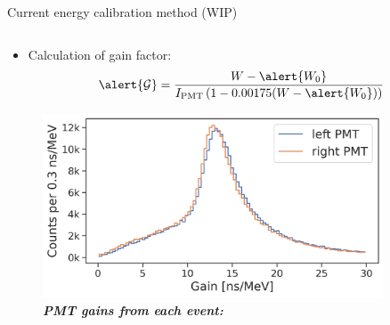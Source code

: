 \documentclass{ikpKoeln}
\begin{document}
\begin{frame}[t]{Current energy calibration method (WIP)}
\begin{columns}[c]
\begin{column}{0.45 \textwidth}
{\begin{itemize}
					      \vspace{-0.5em}
					      $$ \left. \alert{\alpha} = \ln((W_r - W_0) \middle/ (W_l - W_0)) \middle/ (2 \cdot x) \right.$$
					\item \vspace{-1em}Calculation of gain factor:
					      \vspace{-0.5em}
					      $$\alert{\mathcal{G}} = \frac{W - \alert{W_0}}{I_\text{PMT} \left(1 - 0.00175(W - \alert{W_0})\right)}$$
				\end{itemize}
			}
			\begin{figure}
				\captionsetup{singlelinecheck=off}
				\vspace{-2em}
				\caption*{\textit{\textbf{PMT gains from each event:}}}
				\vspace{-1em}
				\includegraphics[width = 0.9\textwidth]{DPG2025/EnergyGain.png}
			\end{figure}
		\end{column}
	\end{columns}
\end{frame}
\end{document}
